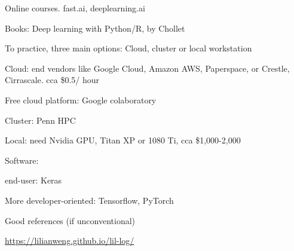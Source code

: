 \documentclass[english]{article}
\begin{document}
\item Online courses. fast.ai, deeplearning.ai
\item Books: Deep learning with Python/R, by Chollet 
\eitem

\item To practice, three main options: Cloud, cluster or local workstation
\bitem
\item Cloud: end vendors like Google Cloud, Amazon AWS, Paperspace, or Crestle, Cirrascale. cca \$0.5/ hour
\item Free cloud platform: Google colaboratory
\item Cluster: Penn HPC
\item Local: need Nvidia GPU, Titan XP or 1080 Ti, cca \$1,000-2,000

\eitem
\item Software: 
\bitem
\item end-user: Keras
\item More developer-oriented: Tensorflow, PyTorch
\eitem

\item Good references (if unconventional)

\url{https://lilianweng.github.io/lil-log/}


\eitem
\end{document}
